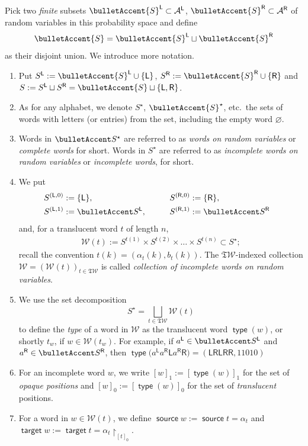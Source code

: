 \documentclass[pdftex]{sigma}
\renewcommand{\restriction}[2]{{#1\mathbin{\upharpoonright}_{#2}}}
\newcommand{\SWc}{{\mathfrak{T}\mathcal{W}}}
\newcommand\IWc{\mathcal{W}}
\DeclareMathOperator{\source}{\mathsf{source}}
\DeclareMathOperator{\target}{\mathsf{target}}
\DeclareMathOperator{\Type}{\mathsf{type}}
\newcommand\LL{{\mathsf{L}}}
\newcommand\RR{{\mathsf{R}}}
\numberwithin{equation}{section}
\begin{document}
Pick two \emph{finite} subsets $\bulletAccent{S}^{\LL} \subset \mathcal{A}^{\LL}$, $\bulletAccent{S}^{\RR}\subset\mathcal{A}^{\RR}$ of random variables in this probability space and define
\[
	\bulletAccent{S} = \bulletAccent{S}^{\LL}\sqcup \bulletAccent{S}^{\RR}
\]
as their disjoint union. We introduce more notation.
\begin{enumerate}\itemsep=0pt
	\item
	 Put
	 $
	 S^{\LL}:=\bulletAccent{S}^{\LL}\cup\{\sf L \}$, $S^{\RR}:=\bulletAccent{S}^{\RR}\cup\{\sf R \}
	 $
	 and
	 $S := S^{\LL} \sqcup S^{\RR} = \bulletAccent{S} \sqcup \{ \sf L, R\}$.

	\item As for any alphabet, we denote $S^\star$, $\bulletAccent{S}^\star$, etc.\ the sets of words with letters (or entries) from the set, including the empty word $\varnothing$.
	\item Words in $\bulletAccent S^\star$ are referred to as {\it words on random variables} or {\it complete words} for short. Words in $S^\star$ are referred to as {\it incomplete words on random variables} or {\it incomplete words}, for short.
	\item We put
	\begin{alignat*}{3}
	 & S^{(\LL,0)}:=\{\LL\},\qquad && S^{(\RR,0)}:=\{\RR\},&\\
	 & S^{(\LL,1)}:=\bulletAccent S^{\LL},\qquad &&
	 S^{(\RR,1)}:=\bulletAccent S^\RR&
	\end{alignat*} and, for a translucent word $t$ of length $n$,
 \begin{align*}
 \IWc(t):=S^{t(1)}\times S^{t(2)}\times\dots \times S^{t(n)}\subset S^\star;
 \end{align*}
 recall the convention $t(k)=(\alpha_t(k),b_t(k))$. The $\SWc$-indexed collection $\IWc=(\IWc(t))_{t\in \SWc}$ is called {\it collection of incomplete words on random variables}.
	\item We use the set decomposition \[S^\star=\bigsqcup_{t\in\SWc} \IWc(t)\]
 to define the {\it type} of a word in $\mathcal{W}$ as the translucent word $\Type(w)$, or shortly $t_w$, if $w\in \IWc(t_w)$.
 For example, if $a^\LL\in \bulletAccent S^{\LL}$ and $a^{\RR}\in \bulletAccent S^{\RR}$, then $\Type\big(a^\LL a^\RR \LL a^\RR\RR\big)=({\LL\RR\LL\RR\RR, 11010})$
	\item For an incomplete word $w$, we write $[w]_1:=[\Type(w)]_1$ for the set of \emph{opaque positions} and $[w]_0:=[\Type(w)]_0$ for the set of \emph{translucent} positions.
	\item For a word in $w\in\IWc(t)$, we define $\source{w}:=\source{t}=\alpha_t$ and $\target{w}:=\target{t}=\restriction{\alpha_t}{[t]_0}$.
\end{enumerate}
\end{document}
